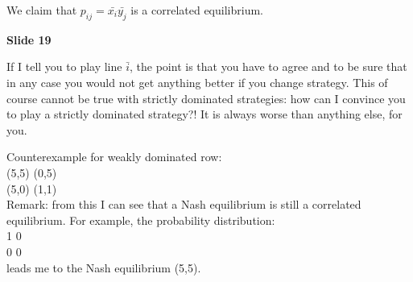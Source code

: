 \noindent We claim that $p_{ij} = \bar{x_i}\bar{y_j}$ is a correlated 
equilibrium.

\bigskip
\noindent \textbf{Slide 19}

\noindent If I tell you to play line $\bar{i}$, the point is that you have to 
agree and to be sure that in any case you would not get anything better if 
you change strategy. This of course cannot be true with strictly dominated 
strategies: how can I convince you to play a strictly dominated strategy?! It 
is always worse than anything else, for you.

\noindent Counterexample for weakly dominated row:\\
(5,5)	(0,5)\\
(5,0)	(1,1)\\
Remark: from this I can see that a Nash equilibrium is still a correlated 
equilibrium. For example, the probability distribution:\\
1	0\\
0	0\\
leads me to the Nash equilibrium (5,5).

%
